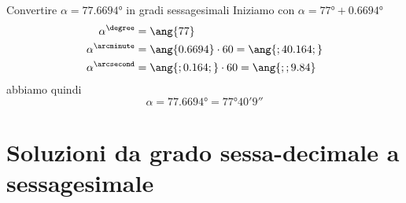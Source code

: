 \begin{exercise}
	Convertire $\alpha=\ang{77.6694}$ in gradi sessagesimali
	\tcblower
	Iniziamo con 
	$\alpha=\ang{77}+\ang{0.6694}$
	\begin{align*}
	\alpha^{\degree}&=\ang{77}\\ 
	\alpha^{\arcminute}&=\ang{0.6694}\cdot 60=\ang{;40.164;}\\
	\alpha^{\arcsecond}&=\ang{;0.164;}\cdot 60=\ang{;;9.84}\\
	\end{align*}
	abbiamo quindi
	\[\alpha=\ang{77.6694}=\ang{77;40;9}\]
\end{exercise}





\tcbstoprecording
\newpage
\section{Soluzioni da grado sessa-decimale a sessagesimale}
\tcbinputrecords